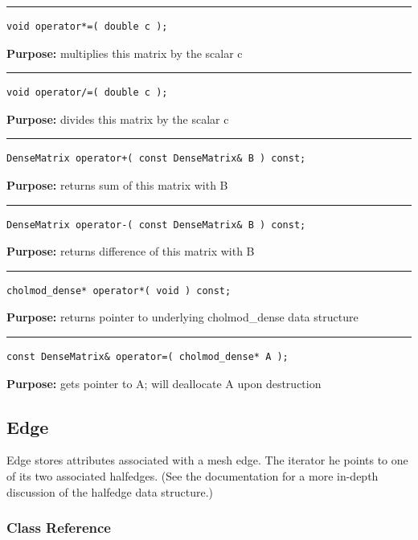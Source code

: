 \documentclass{article}
\begin{document}
\hspace{-.21in}\rule{5in}{1pt}
\begin{verbatim}
void operator*=( double c );
\end{verbatim}
\textbf{Purpose:}
multiplies this matrix by the scalar c

\hspace{-.21in}\rule{5in}{1pt}
\begin{verbatim}
void operator/=( double c );
\end{verbatim}
\textbf{Purpose:}
divides this matrix by the scalar c

\hspace{-.21in}\rule{5in}{1pt}
\begin{verbatim}
DenseMatrix operator+( const DenseMatrix& B ) const;
\end{verbatim}
\textbf{Purpose:}
returns sum of this matrix with B

\hspace{-.21in}\rule{5in}{1pt}
\begin{verbatim}
DenseMatrix operator-( const DenseMatrix& B ) const;
\end{verbatim}
\textbf{Purpose:}
returns difference of this matrix with B

\hspace{-.21in}\rule{5in}{1pt}
\begin{verbatim}
cholmod_dense* operator*( void ) const;
\end{verbatim}
\textbf{Purpose:}
returns pointer to underlying cholmod\_dense data structure

\hspace{-.21in}\rule{5in}{1pt}
\begin{verbatim}
const DenseMatrix& operator=( cholmod_dense* A );
\end{verbatim}
\textbf{Purpose:}
gets pointer to A; will deallocate A upon destruction

\pagebreak
\subsection{Edge}

 

 Edge stores attributes associated with a mesh edge.  The iterator he points to one of its two associated halfedges.  (See the documentation for a more in-depth discussion of the halfedge data structure.) 



\subsubsection{Class Reference}
\end{document}

